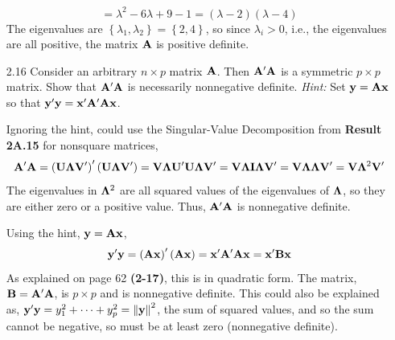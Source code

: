 \begin{enumerate}[font=\bfseries]
\[            =
            \lambda^2 - 6\lambda + 9 - 1
            =
            \left(\lambda - 2\right)\left(\lambda - 4\right)
        \]
        The eigenvalues are $\left\{\lambda_1,\lambda_2\right\} = \left\{2,4\right\}$, so since $\lambda_i > 0$, i.e., the eigenvalues are all positive, the matrix $\bold{A}$ is positive definite.
        \item[2.16] Consider an arbitrary $n \times p$ matrix $\bold{A}$. Then $\bold{A}^\prime \bold{A}$ is a symmetric $p \times p$ matrix. Show
        that $\bold{A}^\prime \bold{A}$ is necessarily nonnegative definite.
        \newline
        \textit{Hint:} Set $\bold{y} = \bold{A}\bold{x}$ so that $\bold{y}^\prime\bold{y} = \bold{x}^\prime\bold{A}^\prime\bold{A}\bold{x}$.
        \par
        Ignoring the hint, could use the Singular-Value Decomposition from \textbf{Result 2A.15} for nonsquare matrices,
        \[
            \bold{A}^\prime\bold{A} 
            = 
            {\left(\bold{U}\bold{\Lambda}\bold{V}^\prime\right)}^\prime\left(\bold{U}\bold{\Lambda}\bold{V}^\prime\right)
            =
            \bold{V}\bold{\Lambda}\bold{U}^\prime\bold{U}\bold{\Lambda}\bold{V}^\prime
            =
            \bold{V}\bold{\Lambda}\bold{I}\bold{\Lambda}\bold{V}^\prime
            =
            \bold{V}\bold{\Lambda}\bold{\Lambda}\bold{V}^\prime
            =
            \bold{V}\bold{\Lambda}^2\bold{V}^\prime
        \]
        The eigenvalues in $\bold{\Lambda}^2$ are all squared values of the eigenvalues of $\bold{\Lambda}$, so they are either zero or a positive value. Thus, $\bold{A}^\prime\bold{A}$ is nonnegative definite.
        \par
        Using the hint, $\bold{y} = \bold{A}\bold{x}$, 
        \[
            \bold{y}^\prime\bold{y} 
            = 
            {\left(\bold{A}\bold{x}\right)}^\prime\left(\bold{A}\bold{x}\right)
            =
            \bold{x}^\prime\bold{A}^\prime\bold{A}\bold{x}
            =
            \bold{x}^\prime\bold{B}\bold{x}
        \]
        As explained on page 62 \textbf{(2-17)}, this is in quadratic form. The matrix, $\bold{B} = \bold{A}^\prime\bold{A}$, is $p \times p$ and is nonnegative definite. This could also be explained as, $\bold{y}^\prime\bold{y} = y_1^2 + \dots + y_p^2 = \left\|\bold{y}\right\|^2$, the sum of squared values, and so the sum cannot be negative, so must be at least zero (nonnegative definite).
        

\end{enumerate}
